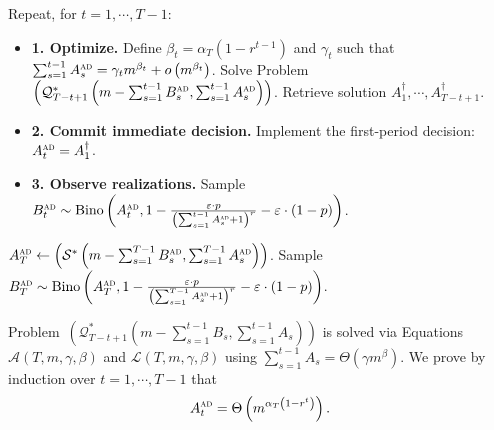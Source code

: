 \documentclass[nonblindrev]{informs3noheader}
\DeclareMathOperator\Bino{Bino}
\def\calA{\mathcal{A}}
\def\calL{\mathcal{L}}
\def\calP{\mathcal{P}}
\def\calQ{\mathcal{Q}}
\def\calS{\mathcal{S}}
\begin{document}
\begin{algorithm} [h!]
\caption{Adaptive algorithm to solve Problem $(\calP^*)$.}\small
\label{alg:adaptive}
\begin{algorithmic}
\item Repeat, for $t=1,\cdots,T-1$:
\begin{itemize}
    \item[] \textbf{1. Optimize.} Define $\beta_t=\alpha_T\left(1-r^{t-1}\right)$ and $\gamma_t$ such that $\sum_{s=1}^{t-1} A^{\textsc{ad}}_s=\gamma_t m^{\beta_t}+o\left(m^{\beta_t}\right)$. Solve Problem $\left(\calQ^*_{T-t+1}\left(m-\sum_{s=1}^{t-1}B^{\textsc{ad}}_s,\sum_{s=1}^{t-1} A^{\textsc{ad}}_s\right)\right)$. Retrieve solution $A^\dagger_1,\cdots,A^\dagger_{T-t+1}$.
    \item[] \textbf{2. Commit immediate decision.} Implement the first-period decision: $A^{\textsc{ad}}_t=A^\dagger_1$.
    \item[] \textbf{3. Observe realizations.} Sample $B^{\textsc{ad}}_t\sim \Bino\left(A^{\textsc{ad}}_t, 1- \frac{\varepsilon\cdot p}{\left(\sum_{s=1}^{t-1} A^{\textsc{ad}}_s +1\right)^r}-\varepsilon\cdot(1-p)\right)$.
\end{itemize}
\item $A^{\textsc{ad}}_T\gets\left(\calS^*\left(m-\sum_{s=1}^{T-1}B^{\textsc{ad}}_s,\sum_{s=1}^{T-1} A^{\textsc{ad}}_s\right)\right)$. Sample $B^{\textsc{ad}}_T\sim \Bino\left(A^{\textsc{ad}}_T, 1- \frac{\varepsilon\cdot p}{\left(\sum_{s=1}^{T-1} A^{\textsc{ad}}_s +1\right)^r}-\varepsilon\cdot(1-p)\right)$.
\end{algorithmic}
\end{algorithm}

Problem~$\left(\calQ^*_{T-t+1}\left(m-\sum_{s=1}^{t-1}B_s,\sum_{s=1}^{t-1} A_s\right)\right)$ is solved via Equations $\calA(T,m,\gamma,\beta)$ and $\calL(T,m,\gamma,\beta)$ using $\sum_{s=1}^{t-1} A_s=\Theta(\gamma m^\beta)$. We prove by induction over $t=1,\cdots,T-1$ that $$A^{\textsc{ad}}_t=\Theta\left(m^{\alpha_T\left(1-r^t\right)}\right).$$
\end{document}
